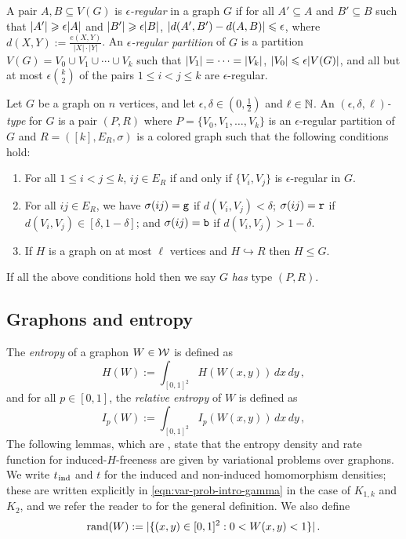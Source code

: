A pair $A,B\subseteq V(G)$ is \emph{$\epsilon$-regular} in a graph $G$ if for all $A'\subseteq A$ and $B'\subseteq B$ such that $\lvert A'\rvert\geqslant\epsilon\lvert A\rvert$ and $\lvert B'\rvert\geqslant\epsilon\lvert B\rvert$, $\lvert d(A',B')-d(A,B)\rvert\leqslant\epsilon$, where $d(X,Y):=\frac{e(X,Y)}{|X|\cdot|Y|}$. An \emph{$\epsilon$-regular partition} of $G$ is a partition $V(G)=V_0\cup V_1\cup\cdots\cup V_k$ such that $\lvert V_1\rvert=\cdots=\lvert V_k\rvert$, $\lvert V_0\rvert\leqslant\epsilon\lvert V(G)\rvert$, and all but at most $\epsilon\binom{k}{2}$ of the pairs $1\leq i<j\leq k$ are $\epsilon$-regular.

\begin{definition}[Type]\label{dfn:type}
Let $G$ be a graph on $n$ vertices, and let $\epsilon,\delta\in(0,\frac{1}{2})$ and $\ell\in{\mathbb N}$. An \emph{$(\epsilon,\delta,\ell)$-type} for $G$ is a pair $(P,R)$ where $P=\{V_0,V_1,\dots,V_k\}$ is an $\epsilon$-regular partition of $G$ and $R=([k],E_R,\sigma)$ is a colored graph such that the following conditions hold:
\begin{enumerate}[
  label=\textit{(\roman*)},
  ref=(\textit{\roman*}),
  topsep=5pt
]
    \item For all $1\leq i<j\leq k$, $ij\in E_R$ if and only if $\{V_i,V_j\}$ is $\epsilon$-regular in $G$.
    \item For all $ij\in E_R$, we have $\sigma(ij)={\normalfont\texttt g}$ if $d(V_i,V_j)<\delta$; $\sigma(ij)={\normalfont\texttt r}$ if $d(V_i,V_j)\in[\delta,1-\delta]$; and $\sigma(ij)={\normalfont\texttt b}$ if $d(V_i,V_j)>1-\delta$.
    \item\label{item:type-colored-homo} If $H$ is a graph on at most $\ell$ vertices and $H\hookrightarrow R$ then $H\leq G$.
\end{enumerate}
If all the above conditions hold then we say $G$ \emph{has} type $(P,R)$.
\end{definition}


\subsection{Graphons and entropy}\label{subsec:graphons}
The \emph{entropy} of a graphon $W\in{\mathcal W}$ is defined as
$$H(W):=\int_{[0,1]^2}H(W(x,y))\,dx\,dy\,,$$
and for all $p\in[0,1]$, the \emph{relative entropy} of $W$ is defined as
$$I_p(W):=\int_{[0,1]^2}I_p(W(x,y))\,dx\,dy\,,$$
The following lemmas, which are \cite[Propositions~2.10~\&~2.11]{perkins2025typical}, state that the entropy density and rate function for induced-$H$-freeness are given by variational problems over graphons. We write $t_{\hspace{0.2mm}\mathrm{ind}}$ and $t$ for the induced and non-induced homomorphism densities; these are written explicitly in \eqref{eqn:var-prob-intro-gamma} in the case of $K_{1,k}$ and $K_2$, and we refer the reader to \cite{lovasz2012large} for the general definition. We also define
$$\operatorname{rand}(W):=\lvert\{(x,y)\in[0,1]^2:0<W(x,y)<1\}\rvert\,.$$

